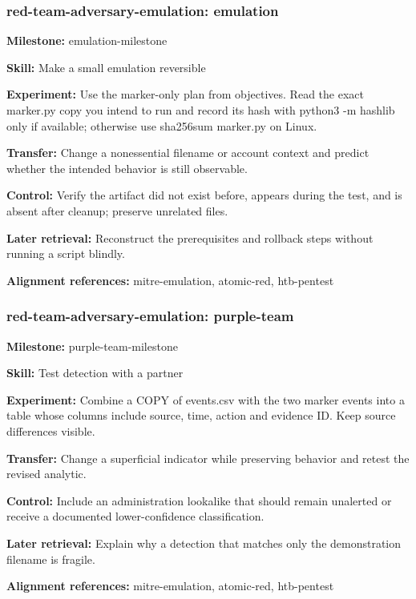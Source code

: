 \subsubsection{red-team-adversary-emulation: emulation}
\noindent\textbf{Milestone:} emulation-milestone\par
\noindent\textbf{Skill:} Make a small emulation reversible\par
\noindent\textbf{Experiment:} Use the marker-only plan from objectives. Read the exact marker.py copy you intend to run and record its hash with python3 -m hashlib only if available; otherwise use sha256sum marker.py on Linux.\par
\noindent\textbf{Transfer:} Change a nonessential filename or account context and predict whether the intended behavior is still observable.\par
\noindent\textbf{Control:} Verify the artifact did not exist before, appears during the test, and is absent after cleanup; preserve unrelated files.\par
\noindent\textbf{Later retrieval:} Reconstruct the prerequisites and rollback steps without running a script blindly.\par
\noindent\textbf{Alignment references:} mitre-emulation, atomic-red, htb-pentest\par
\subsubsection{red-team-adversary-emulation: purple-team}
\noindent\textbf{Milestone:} purple-team-milestone\par
\noindent\textbf{Skill:} Test detection with a partner\par
\noindent\textbf{Experiment:} Combine a COPY of events.csv with the two marker events into a table whose columns include source, time, action and evidence ID. Keep source differences visible.\par
\noindent\textbf{Transfer:} Change a superficial indicator while preserving behavior and retest the revised analytic.\par
\noindent\textbf{Control:} Include an administration lookalike that should remain unalerted or receive a documented lower-confidence classification.\par
\noindent\textbf{Later retrieval:} Explain why a detection that matches only the demonstration filename is fragile.\par
\noindent\textbf{Alignment references:} mitre-emulation, atomic-red, htb-pentest\par
